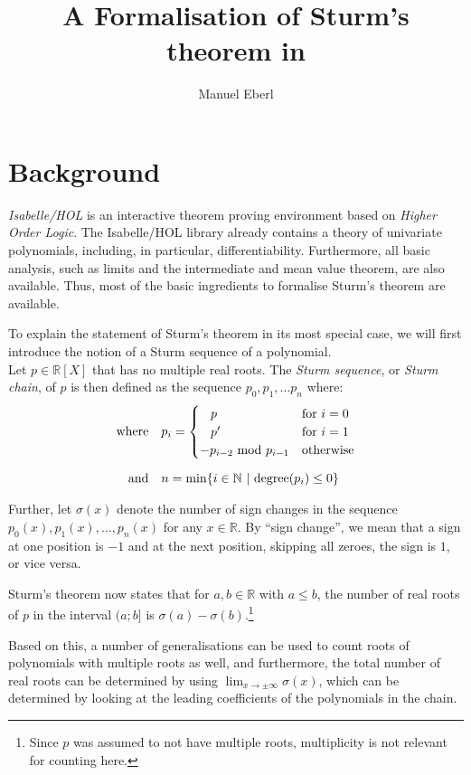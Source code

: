 \documentclass[11pt,a4paper,oneside]{article}
\title{A Formalisation of Sturm's theorem in \isabellehol}
\author{Manuel Eberl}
\newcommand{\RR}{\mathbb{R}}
\newcommand{\NN}{\mathbb{N}}
\newcommand{\isabellehol}{\mbox{Isabelle}\slash HOL\xspace}
\begin{document}
\maketitle
\vskip-3mm

\section{Background}

\emph{\isabellehol} is an interactive theorem proving environment based on 
\emph{Higher Order Logic}. The \isabellehol library already contains a 
theory of univariate polynomials, including, in particular, differentiability. 
Furthermore, all basic analysis, such as limits and the intermediate and mean value 
theorem, are also available. Thus, most of the basic ingredients to 
formalise Sturm's theorem are available.

To explain the statement of Sturm's theorem in its most special case, 
we will first introduce the notion of a Sturm sequence of a polynomial.\\
Let $p\in\RR[X]$ that has no multiple real roots. The \emph{Sturm sequence}, 
or \emph{Sturm chain}, of $p$ is then defined as the sequence 
$p_0,p_1,\ldots p_n$ where:
\begin{align*}
&&\mathrm{where}\quad &p_i = \begin{cases}
\hskip3mm p & \mathrm{for}\ i = 0\\
\hskip3mm p' & \mathrm{for}\ i = 1\\
-p_{i-2}\ \mathrm{mod}\ p_{i-1} &\mathrm{otherwise}
\end{cases}&\\[2mm]
&&\mathrm{and}\quad &n=\mathrm{min} \{i\in\NN\ |\ \mathrm{degree}(p_i) \leq 0\}&
\end{align*}

Further, let $\sigma(x)$ denote the number of sign changes in the sequence 
$p_0(x), p_1(x), \ldots, p_n(x)$ for any $x \in \RR$. 
By \enquote{sign change}, we mean that a sign at one position is $-1$ and at the 
next position, skipping all zeroes, the sign is $1$, or vice versa.

Sturm's theorem now states that for $a,b\in\RR$ with $a\leq b$, the number of 
real roots of $p$ in the interval $(a;b]$ is $\sigma(a)-\sigma(b)$.\footnote{
Since $p$ was assumed to not have multiple roots, multiplicity is not relevant 
for counting here.}

Based on this, a number of generalisations can be used to count roots of 
polynomials with multiple roots as well, and furthermore, the total number of 
real roots can be determined by using $\lim_{x\to\pm\infty} \sigma(x)$, which 
can be determined by looking at the leading coefficients of the polynomials in 
the chain.
\end{document}

